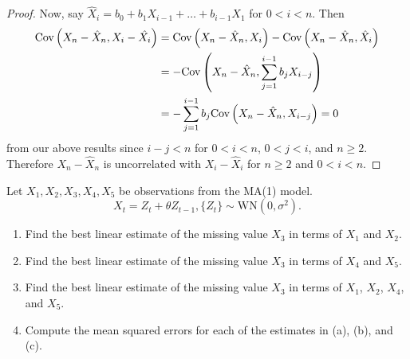 \documentclass[12pt]{article}
\theoremstyle{definition}
\newenvironment{custompbm}[1]
  {\renewcommand\theproblem{#1}\problem}
  {\endproblem}
\newcommand{\Co}[2]{\text{Cov}\left({#1}, {#2}\right)}
\begin{document}
\begin{proof}
  Now, say $\hat{X}_i = b_0 + b_1 X_{i-1} + \dots + b_{i-1}X_{1}$ for $0 < i < n$. Then
  \begin{align*}
    \Co{X_n - \hat{X}_n}{X_i - \hat{X_i}} &= \Co{X_n - \hat{X}_n}{X_i} - \Co{X_n - \hat{X}_n}{\hat{X}_i} \\
    &= -\Co{X_n - \hat{X}_n}{\sum_{j=1}^{i-1} b_j X_{i-j}} \notag\\
    &= -\sum_{j=1}^{i-1} b_j \Co{X_n - \hat{X}_n}{X_{i-j}} = 0 \notag \\
  \end{align*}
  from our above results since $i - j < n$ for $0 < i < n$, $0 < j < i$, and $n \geq 2$.
  Therefore $X_n - \hat{X}_n$ is uncorrelated with $X_i - \hat{X}_i$ for $n\geq 2$ and $0 < i < n$.


\end{proof}


\begin{custompbm}{2.21}
  Let $X_1, X_2, X_3, X_4, X_5$ be observations from the MA(1) model.
  \[
    X_t = Z_t + \theta Z_{t-1}, \{Z_t\} \sim \text{WN}(0, \sigma^2).
  \]
  \begin{enumerate}
    \item Find the best linear estimate of the missing value $X_3$ in terms of
      $X_1$ and $X_2$.
    \item Find the best linear estimate of the missing value $X_3$ in terms of
      $X_4$ and $X_5$.
    \item Find the best linear estimate of the missing value $X_3$ in terms of
      $X_1$, $X_2$, $X_4$, and $X_5$.
    \item Compute the mean squared errors for each of the estimates in (a),
      (b), and (c).
  \end{enumerate}
\end{custompbm}
\end{document}
